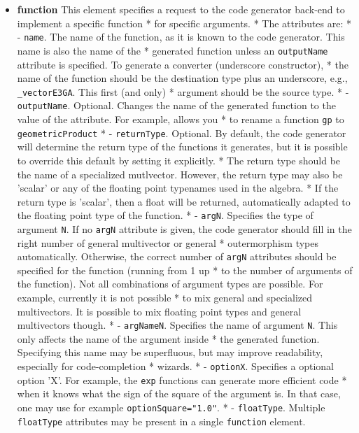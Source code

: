 \documentclass[10pt, a4paper]{article}
\begin{document}
\begin{itemize}
\item {\bf function} This element specifies a request to the code generator back-end to implement a specific function
 *     for specific arguments.
 *     The attributes are:
 *        - {\tt name}. The name of the function, as it is known to the code generator. This name is also the name of the
 *           generated function unless an {\tt outputName} attribute is specified. To generate a converter (underscore constructor),
 *           the name of the function should be the destination type plus an underscore, e.g., {\tt _vectorE3GA}. This first (and only)
 *           argument should be the source type.
 *        - {\tt outputName}. Optional. Changes the name of the generated function to the value of the attribute. For example, allows you
 *          to rename a function {\tt gp} to {\tt geometricProduct}
 *        - {\tt returnType}. Optional. By default, the code generator will determine the return type of the functions it generates, but it is possible to override this default by setting it explicitly. 
 *          The return type should be the name of a specialized mutlvector. However, the return type may also be 'scalar' or any of the floating point typenames used in the algebra.
 *          If the return type is 'scalar', then a float will be returned, automatically adapted to the floating point type of the function.
 *        - {\tt argN}. Specifies the type of argument {\tt N}. If no {\tt argN} attribute is given, the code generator should fill in the right number of general multivector or general 
 *           outermorphism types automatically. Otherwise, the correct number of {\tt argN} attributes should be specified for the function (running from 1 up
 *           to the number of arguments of the function). Not all combinations of argument types are possible. For example, currently it is not possible
 *           to mix general and specialized multivectors. It is possible to mix floating point types and general multivectors though.
 *        - {\tt argNameN}. Specifies the name of argument {\tt N}. This only affects the name of the argument inside
 *           the generated function. Specifying this name may be superfluous, but may improve readability, especially for code-completion
 *           wizards. 
 *        - {\tt optionX}. Specifies a optional option 'X'. For example, the {\tt exp} functions can generate more efficient code
 *           when it knows what the sign of the square of the argument is. In that case, one may use for example {\tt optionSquare="1.0"}.
 *        - {\tt floatType}. Multiple {\tt floatType} attributes may be present in a single {\tt function} element. 

\end{itemize}
\end{document}
